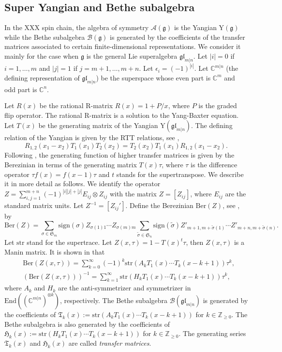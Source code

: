 \documentclass[11pt,reqno]{amsart}
\numberwithin{equation}{section}
\theoremstyle{definition}
\theoremstyle{remark}
\newcommand{\C}{\mathbb{C}}
\newcommand{\Z}{\mathbb{Z}}
\newcommand{\mc}{\mathcal}
\newcommand{\g}{\mathfrak{g}}
\newcommand{\fkS}{\mathfrak{S}}
\newcommand{\fkT}{\mathfrak{T}}
\newcommand{\End}{\mathrm{End}}
\newcommand{\str}{{\mathrm{str}}}
\newcommand{\tl}{\tilde}
\newcommand{\gge}{\geqslant}
\newcommand{\glMN}{\mathfrak{gl}_{m|n}}
\newcommand{\YglMN}{\mathrm{Y}(\mathfrak{gl}_{m|n})}
\begin{document}
\subsection{Super Yangian and Bethe subalgebra}
In the XXX spin chain, the algebra of symmetry $\mc A(\g)$ is the Yangian $\mathrm Y(\g)$ while the Bethe subalgebra $\mc B(\g)$ is generated by the coefficients of the transfer matrices associated to certain finite-dimensional representations. We consider it mainly for the case when $\g$ is the general Lie superalgebra $\glMN$. Let $|i|=0$ if $i=1,\dots,m$ and $|j|=1$ if $j=m+1,\dots,m+n$. Let $\epsilon_i=(-1)^{|i|}$. Let $\C^{m|n}$ (the defining representation of $\glMN$) be the superspace whose even part is $\C^m$ and odd part is $\C^n$. 

Let $R(x)$ be the rational R-matrix $R(x)=1+P/x$, where $P$ is the graded flip operator. The rational R-matrix is a solution to the Yang-Baxter equation. Let $T(x)$ be the generating matrix of the Yangian $\YglMN$. The defining relation of the Yangian is given by the RTT relations, see \cite{Naz:1991},
\[
R_{1,2}(x_1-x_2)T_1(x_1)T_2(x_2)=T_2(x_2)T_1(x_1)R_{1,2}(x_1-x_2).
\]
Following \cite{MR:2014}, the generating function of higher transfer matrices is given by the Berezinian in terms of the generating matrix $T(x)\tau$, where $\tau$ is the difference operator $\tau f(x)=f(x-1)\tau$ and $t$ stands for the supertranspose. We describe it in more detail as follows. We identify the operator $Z=\sum_{i,j=1}^{m+n}(-1)^{|i||j|+|j|}E_{ij}\otimes Z_{ij}$ with the matrix $Z=[Z_{ij}]$, where $E_{ij}$ are the standard matrix units. Let $Z^{-1}=[Z_{ij}']$. Define the Berezinian $\mathrm{Ber}(Z)$, see \cite{Naz:1991}, by
\[
\mathrm{Ber}(Z)=\sum_{\sigma\in\fkS_m}\mathrm{sign}(\sigma)Z_{\sigma(1)1}\cdots Z_{\sigma(m)m}\sum_{\tl\sigma\in\fkS_n}\mathrm{sign}(\tl\sigma)Z'_{m+1,m+\tl\sigma(1)}\cdots Z'_{m+n,m+\tl\sigma(n)}.
\]
Let $\str$ stand for the supertrace. Let $Z(x,\tau)=1-T(x)^t\tau$, then $Z(x,\tau)$ is a Manin matrix. It is shown in \cite[Theorem 2.13]{MR:2014} that \begin{align*}
&\mathrm{Ber}(Z(x,\tau))= \sum_{k=0}^\infty (-1)^k\mathrm{str}(A_kT_1(x)\cdots T_k(x-k+1))\tau^k,\\
&(\mathrm{Ber}(Z(x,\tau)))^{-1}= \sum_{k=1}^\infty \mathrm{str}(H_kT_1(x)\cdots T_k(x-k+1))\tau^k ,
\end{align*}
where $A_k$ and $H_k$ are the anti-symmetrizer and symmetrizer in $\End((\C^{m|n})^{\otimes k})$, respectively. The Bethe subalgebra $\mc B(\glMN)$ is generated by the coefficients of $\fkT_k(x):=\mathrm{str}(A_kT_1(x)\cdots T_k(x-k+1))$ for $k\in \Z_{\gge 0}$. The Bethe subalgebra is also generated by the coefficients of $\mathfrak H_k(x):=\mathrm{str}(H_kT_1(x)\cdots T_k(x-k+1))$ for $k\in \Z_{\gge 0}$. The generating series $\fkT_k(x)$ and $\mathfrak H_k(x)$ are called \emph{transfer matrices}.
\end{document}
